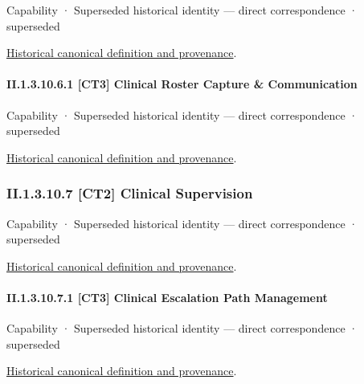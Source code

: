 \label{element:b6527516a69c499d8cc9c8fe881169fe}
{\small Capability · Superseded historical identity — direct correspondence · superseded}\par
\href{../../../../continuum/strategy/capability/b6527516a69c499d8cc9c8fe881169fe.md}{Historical canonical definition and provenance}.\par
\paragraph*{II.1.3.10.6.1 [CT3] Clinical Roster Capture \& Communication}
\label{navigation:II.1.3.10.6.1}

\label{element:2054d57bb33a4361b3ef0824545a1784}
{\small Capability · Superseded historical identity — direct correspondence · superseded}\par
\href{../../../../continuum/strategy/capability/2054d57bb33a4361b3ef0824545a1784.md}{Historical canonical definition and provenance}.\par
\subsubsection*{II.1.3.10.7 [CT2] Clinical Supervision}
\label{navigation:II.1.3.10.7}

\label{element:50c838981f3946d78e8f78d18e31c70c}
{\small Capability · Superseded historical identity — direct correspondence · superseded}\par
\href{../../../../continuum/strategy/capability/50c838981f3946d78e8f78d18e31c70c.md}{Historical canonical definition and provenance}.\par
\paragraph*{II.1.3.10.7.1 [CT3] Clinical Escalation Path Management}
\label{navigation:II.1.3.10.7.1}

\label{element:759a2e52172345e8ad1bc96d7e5ddad3}
{\small Capability · Superseded historical identity — direct correspondence · superseded}\par
\href{../../../../continuum/strategy/capability/759a2e52172345e8ad1bc96d7e5ddad3.md}{Historical canonical definition and provenance}.\par
